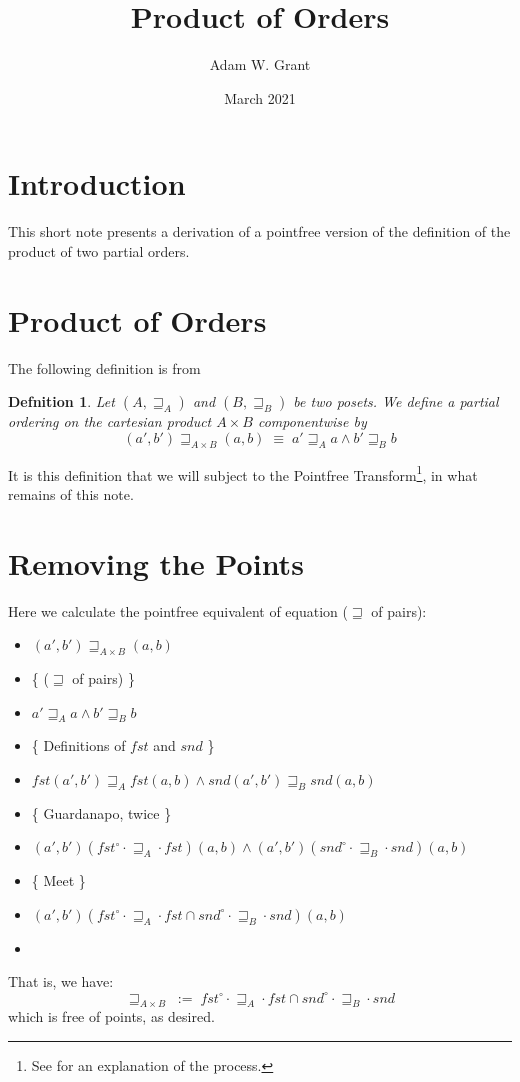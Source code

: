 \documentclass{article}
\title{Product of Orders}
\author{Adam W. Grant}
\date{March 2021}
\newtheorem*{defn}{Defnition}
\begin{document}
\maketitle

\section{Introduction}
This short note presents a derivation of a pointfree version of the definition of the product of two partial orders.

\section{Product of Orders}
The following definition is from \cite{10.5555/551462}
\begin{defn}
Let $(A,\sqsupseteq_A)$ and $(B,\sqsupseteq_B)$ be two posets.  We define a partial ordering on the cartesian product $A \times B$ componentwise by
\begin{equation}
    (a',b') \sqsupseteq_{A\times B} (a,b) \;\equiv\; a' \sqsupseteq_A a \wedge b' \sqsupseteq_B b \tag{$\sqsupseteq$ of pairs}
\end{equation}
\end{defn}
It is this definition that we will subject to the Pointfree Transform\footnote{See \cite{Oliveira2009} for an explanation of the process.}, in what remains of this note.

\section{Removing the Points}
Here we calculate the pointfree equivalent of equation ($\sqsupseteq$ of pairs):
\renewcommand{\labelitemii}{\textbullet}
\begin{itemize}
    \item $(a',b') \sqsupseteq_{A\times B} (a,b)$
    \item[$\equiv$] \{ ($\sqsupseteq$ of pairs) \}
    \item[] $a' \sqsupseteq_A a \wedge b' \sqsupseteq_B b$
    \item[$\equiv$] \{ Definitions of $fst$ and $snd$ \}
    \item[] $fst(a',b') \sqsupseteq_A fst(a,b) \wedge snd(a',b') \sqsupseteq_B snd(a,b)$
    \item[$\equiv$] \{ Guardanapo, twice \}
    \item[] $(a',b') (fst^{\circ} \cdot \sqsupseteq_A \cdot fst) (a,b) \wedge (a',b') (snd^{\circ} \cdot \sqsupseteq_B \cdot snd) (a,b)$
    \item[$\equiv$] \{ Meet \}
    \item[] $(a',b') (fst^{\circ} \cdot \sqsupseteq_A \cdot fst \cap snd^{\circ} \cdot \sqsupseteq_B \cdot snd) (a,b)$
    \item[\Heart]
\end{itemize}
That is, we have:
\begin{equation*}
    \sqsupseteq_{A\times B} \;:=\; fst^{\circ} \cdot \sqsupseteq_A \cdot fst \cap snd^{\circ} \cdot \sqsupseteq_B \cdot snd
\end{equation*}
which is free of points, as desired.



\end{document}
